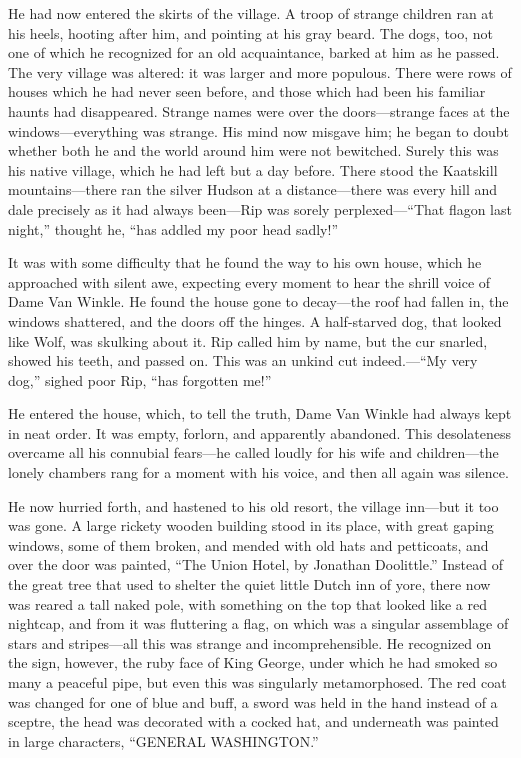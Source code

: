 He had now entered the skirts of the village. A troop of strange children ran at his heels, hooting after him, and pointing at his gray beard. The dogs, too, not one of which he recognized for an old acquaintance, barked at him as he passed. The very village was altered: it was larger and more populous. There were rows of houses which he had never seen before, and those which had been his familiar haunts had disappeared. Strange names were over the doors—strange faces at the windows—everything was strange. His mind now misgave him; he began to doubt whether both he and the world around him were not bewitched. Surely this was his native village, which he had left but a day before. There stood the Kaatskill mountains—there ran the silver Hudson at a distance—there was every hill and dale precisely as it had always been—Rip was sorely perplexed—“That flagon last night,” thought he, “has addled my poor head sadly!”

It was with some difficulty that he found the way to his own house, which he approached with silent awe, expecting every moment to hear the shrill voice of Dame Van Winkle. He found the house gone to decay—the roof had fallen in, the windows shattered, and the doors off the hinges. A half-starved dog, that looked like Wolf, was skulking about it. Rip called him by name, but the cur snarled, showed his teeth, and passed on. This was an unkind cut indeed.—“My very dog,” sighed poor Rip, “has forgotten me!”

He entered the house, which, to tell the truth, Dame Van Winkle had always kept in neat order. It was empty, forlorn, and apparently abandoned. This desolateness overcame all his connubial fears—he called loudly for his wife and children—the lonely chambers rang for a moment with his voice, and then all again was silence.

He now hurried forth, and hastened to his old resort, the village inn—but it too was gone. A large rickety wooden building stood in its place, with great gaping windows, some of them broken, and mended with old hats and petticoats, and over the door was painted, “The Union Hotel, by Jonathan Doolittle.” Instead of the great tree that used to shelter the quiet little Dutch inn of yore, there now was reared a tall naked pole, with something on the top that looked like a red nightcap, and from it was fluttering a flag, on which was a singular assemblage of stars and stripes—all this was strange and incomprehensible. He recognized on the sign, however, the ruby face of King George, under which he had smoked so many a peaceful pipe, but even this was singularly metamorphosed. The red coat was changed for one of blue and buff, a sword was held in the hand instead of a sceptre, the head was decorated with a cocked hat, and underneath was painted in large characters, “GENERAL WASHINGTON.”

